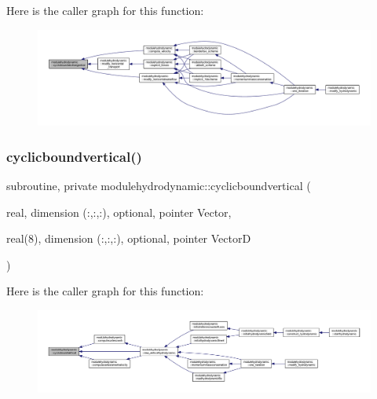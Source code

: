 Here is the caller graph for this function\+:\nopagebreak
\begin{figure}[H]
\begin{center}
\leavevmode
\includegraphics[width=350pt]{namespacemodulehydrodynamic_a0d8c9bbfb63616e6ad93ba589923c7eb_icgraph}
\end{center}
\end{figure}
\mbox{\label{namespacemodulehydrodynamic_a700b6b9b38f8b3e2c1a84293c349c18a}} 
\subsubsection{\texorpdfstring{cyclicboundvertical()}{cyclicboundvertical()}}
{\footnotesize\ttfamily subroutine, private modulehydrodynamic\+::cyclicboundvertical (\begin{DoxyParamCaption}\item[{real, dimension (\+:,\+:,\+:), optional, pointer}]{Vector,  }\item[{real(8), dimension (\+:,\+:,\+:), optional, pointer}]{VectorD }\end{DoxyParamCaption})\hspace{0.3cm}{\ttfamily [private]}}

Here is the caller graph for this function\+:\nopagebreak
\begin{figure}[H]
\begin{center}
\leavevmode
\includegraphics[width=350pt]{namespacemodulehydrodynamic_a700b6b9b38f8b3e2c1a84293c349c18a_icgraph}
\end{center}
\end{figure}
\mbox{\label{namespacemodulehydrodynamic_a51f796ba1d401f24370c5f9dd5ec71ae}} 
